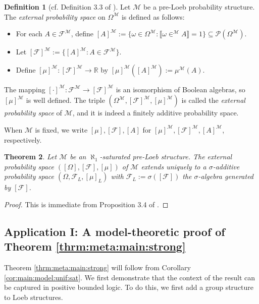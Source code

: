 \documentclass[11pt]{amsart}
\newtheorem{theorem}{Theorem}[section]
\theoremstyle{definition}
\newtheorem{definition}[theorem]{Definition}
\theoremstyle{remark}
\def\RR{\mathbb{R}}
\newcommand{\model}[1]{\llbracket {#1} \rrbracket }
\begin{document}
\begin{definition}[cf. Definition 3.3 of \cite{DI2017}]
    Let $\mathcal{M}$ be a pre-Loeb probability structure.  
    The \emph{external probability space} on $\Omega^{\mathcal{M}}$ is defined as follows:
    \begin{itemize}
        \item For each $A \in \mathcal{F}^{\mathcal{M}}$, define $[A]^{\mathcal{M}} := \{ \omega \in \Omega^{\mathcal{M}} : \model{\omega \in^{\mathcal{M}} A} = 1 \} \subseteq \mathcal{P}(\Omega^{\mathcal{M}})$.
        \item Let $[\mathcal{F}]^{\mathcal{M}} := \{ [A]^{\mathcal{M}} : A \in \mathcal{F}^{\mathcal{M}} \}$.
            \medskip
        \item Define $[\mu]^{\mathcal{M}} : [\mathcal{F}]^{\mathcal{M}} \to \RR$ by $[\mu]^{\mathcal{M}}([A]^{\mathcal{M}}) := \mu^{\mathcal{M}}(A)$.
    \end{itemize}
    The mapping $[\cdot]^{\mathcal{M}}: \mathcal{F}^{\mathcal{M}} \to [\mathcal{F}]^{\mathcal{M}}$ is an isomorphism of Boolean algebras, so $[\mu]^{\mathcal{M}}$ is well defined.  
    The triple $(\Omega^{\mathcal{M}}, [\mathcal{F}]^{\mathcal{M}}, [\mu]^{\mathcal{M}})$ is called the \emph{external probability space} of $\mathcal{M}$, and it is indeed a finitely additive probability space.
\end{definition}

When $\mathcal{M}$ is fixed, we write $[\mu], [\mathcal{F}], [A]$ for $[\mu]^{\mathcal{M}}, [\mathcal{F}]^{\mathcal{M}}, [A]^{\mathcal{M}}$,  respectively.

\begin{theorem}
\label{thrm:extensionLoeb}
    Let $\mathcal{M}$ be an $\aleph_1$-saturated pre-Loeb structure.  
    The external probability space $([\Omega], [\mathcal{F}], [\mu])$ of $\mathcal{M}$ extends uniquely to a $\sigma$-additive probability space $(\Omega, \mathcal{F}_L, [\mu]_L)$ with $\mathcal{F}_L:= \sigma([\mathcal{F}])$ the $\sigma$-algebra generated by $[\mathcal{F}]$.
\end{theorem}
\begin{proof}
    This is immediate from  Proposition 3.4 of \cite{DI2017}.
\end{proof} 

\subsection{Application I: A model-theoretic proof of Theorem  \ref{thrm:meta:main:strong}}
\label{subsec:model:APP1}
Theorem  \ref{thrm:meta:main:strong} will follow from Corollary \ref{cor:main:model:unif:sat}. We first demonstrate that the context of the result can be captured in positive bounded logic. To do this, we first add a group structure to Loeb structures.
\end{document}
